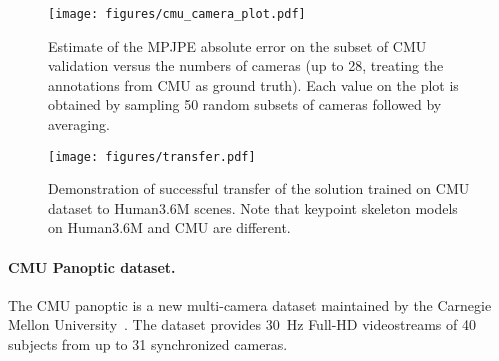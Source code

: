 \documentclass[10pt,twocolumn,letterpaper]{article}
\begin{document}
\begin{figure}

    \centering
    \texttt{[image: figures/cmu\_camera\_plot.pdf]}
    \caption{Estimate of the MPJPE absolute error on the subset of CMU validation versus the numbers of cameras (up to 28, treating the annotations from CMU as ground truth). Each value on the plot is obtained by sampling 50 random subsets of cameras followed by averaging.}
    \label{fig:cam_scaling}
    
\end{figure}

\begin{table}
	\centering
	\small
{}
	\caption{Results of evaluation on the CMU dataset in terms of MPJPE error on the CMU dataset validation (using 4 cameras).}
	\label{table_cmu_1}
\end{table}

\begin{figure*}

    \centering
    \texttt{[image: figures/transfer.pdf]}
    \caption{Demonstration of successful transfer of the solution trained on CMU dataset to Human3.6M scenes. Note that keypoint skeleton models on Human3.6M and CMU are different.}
    \label{fig:cmu_transfer}
    
\end{figure*}


\paragraph{CMU Panoptic dataset.} The CMU panoptic is a new multi-camera dataset maintained by the Carnegie Mellon University~\cite{Joo_2017_TPAMI,xiang2018monocular,Simon_2017_CVPR}. The dataset provides 30~Hz Full-HD videostreams of 40 subjects from up to 31 synchronized cameras.
\end{document}
